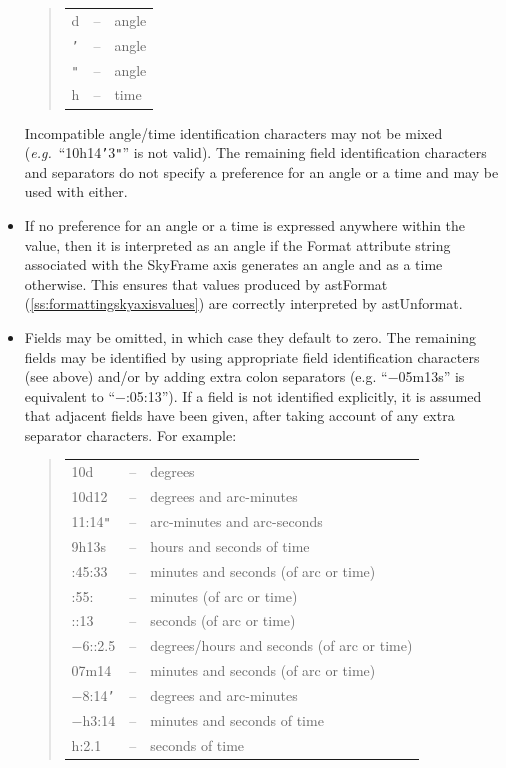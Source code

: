 \documentclass[twoside,11pt]{article}
\newcommand{\secref}[1]{\S\ref{#1}}
\renewcommand{\secref}[1]{\ref{#1}}
\begin{document}
\begin{itemize}
\begin{quote}
\begin{tabular}{lll}
d & -- & angle \\
{\tt{'}} & -- & angle \\
{\tt{"}} & -- & angle \\
h & -- & time
\end{tabular}
\end{quote}

Incompatible angle/time identification characters may not be mixed
({\em{e.g.}}\ ``10h14{\tt{'}}3{\tt{"}}'' is not valid).  The remaining
field identification characters and separators do not specify a
preference for an angle or a time and may be used with either.

\item If no preference for an angle or a time is expressed anywhere
within the value, then it is interpreted as an angle if the Format
attribute string associated with the SkyFrame axis generates an angle
and as a time otherwise.  This ensures that values produced by
astFormat (\secref{ss:formattingskyaxisvalues}) are correctly
interpreted by astUnformat.

\item Fields may be omitted, in which case they default to zero. The
remaining fields may be identified by using appropriate field
identification characters (see above) and/or by adding extra colon
separators (e.g. ``$-$05m13s'' is equivalent to ``$-$:05:13''). If a field
is not identified explicitly, it is assumed that adjacent fields have
been given, after taking account of any extra separator
characters. For example:

\begin{quote}
\begin{tabular}{lll}
10d & -- & degrees \\
10d12 & -- & degrees and arc-minutes \\
11:14{\tt{"}} & -- & arc-minutes and arc-seconds \\
9h13s & -- & hours and seconds of time \\
:45:33 & -- & minutes and seconds (of arc or time) \\
:55: & -- & minutes (of arc or time) \\
::13 & -- & seconds (of arc or time) \\
$-$6::2.5 & -- & degrees/hours and seconds (of arc or time) \\
07m14 & -- & minutes and seconds (of arc or time) \\
$-$8:14{\tt{'}} & -- & degrees and arc-minutes \\
$-$h3:14 & -- & minutes and seconds of time \\
h:2.1 & -- & seconds of time
\end{tabular}
\end{quote}


\end{itemize}
\end{document}
